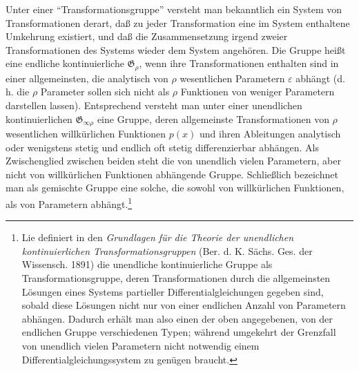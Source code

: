 \documentclass[11pt]{article}
\providecommand{\eps}{\varepsilon}
\providecommand{\G}{\mathfrak G}
\begin{document}
Unter einer ``Transformationsgruppe'' versteht man bekanntlich ein System von Transformationen derart, daß zu jeder Transformation eine im System enthaltene Umkehrung existiert, und daß die Zusammensetzung irgend zweier Transformationen des Systems wieder dem System angehören. Die Gruppe heißt eine endliche kontinuierliche \(\G_\rho\), wenn ihre Transformationen enthalten sind in einer allgemeinsten, die analytisch von \(\rho\) wesentlichen Parametern \(\eps\) abhängt (d.\,h. die \(\rho\) Parameter sollen sich nicht als \(\rho\) Funktionen von weniger Parametern darstellen lassen). Entsprechend versteht man unter einer unendlichen kontinuierlichen \(\G_{\infty\rho}\) eine Gruppe, deren allgemeinste Transformationen von \(\rho\) wesentlichen willkürlichen Funktionen \(p(x)\) und ihren Ableitungen analytisch oder wenigstens stetig und endlich oft stetig differenzierbar abhängen. Als Zwischenglied zwischen beiden steht die von unendlich vielen Parametern, aber nicht von willkürlichen Funktionen abhängende Gruppe. Schließlich bezeichnet man als gemischte Gruppe eine solche, die sowohl von willkürlichen Funktionen, als von Parametern abhängt.\footnote{Lie definiert in den \emph{Grundlagen für die Theorie der unendlichen kontinuierlichen Transformationsgruppen} (Ber. d. K. Sächs. Ges. der Wissensch. 1891) die unendliche kontinuierliche Gruppe als Transformationsgruppe, deren Transformationen durch die allgemeinsten Lösungen eines Systems partieller Differentialgleichungen gegeben sind, sobald diese Lösungen nicht nur von einer endlichen Anzahl von Parametern abhängen. Dadurch erhält man also einen der oben angegebenen, von der endlichen Gruppe verschiedenen Typen; während umgekehrt der Grenzfall von unendlich vielen Parametern nicht notwendig einem Differentialgleichungssystem zu genügen braucht.}
\end{document}
